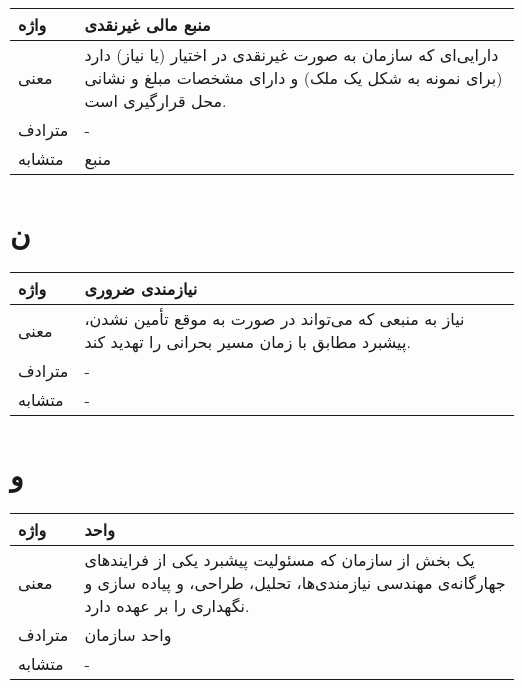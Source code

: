 \begin{table}[H]
	\centering
	\begin{tabular}{| p{1.5cm} | p{5cm} |}
		\hline
		واژه & منبع مالی غیرنقدی \\
		\hline
		معنی  &  دارایی‌ای که سازمان به صورت غیرنقدی در اختیار (یا نیاز) دارد  (برای نمونه به شکل یک ملک) و دارای مشخصات مبلغ و نشانی محل قرارگیری است. \\
		\hline
		مترادف & - \\
		\hline
		متشابه  & منبع \\
		\hline
	\end{tabular}
\end{table}


\section*{ن}%

\begin{table}[H]
	\centering
	\begin{tabular}{| p{1.5cm} | p{5cm} |}
		\hline
		واژه & نیازمندی ضروری \\
		\hline
		معنی  & نیاز به منبعی که می‌تواند در صورت به موقع تأمین نشدن، پیشبرد مطابق با زمان مسیر بحرانی را تهدید کند. \\
		\hline
		مترادف & - \\
		\hline
		متشابه  & - \\
		\hline
	\end{tabular}
\end{table}

\section*{و}%
\begin{table}[H]
	\centering
	\begin{tabular}{| p{1.5cm} | p{5cm} |}
		\hline
		واژه & واحد \\
		\hline
		معنی  & یک بخش از سازمان که مسئولیت پیشبرد یکی از فرایندهای جهارگانه‌ی مهندسی نیازمندی‌ها، تحلیل، طراحی، و پیاده سازی و نگهداری را بر عهده دارد.\\
		\hline
		مترادف & واحد سازمان \\
		\hline
		متشابه  & - \\
		\hline
	\end{tabular}
\end{table}
